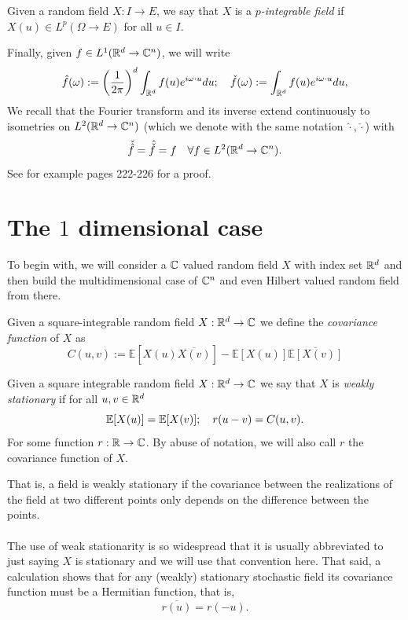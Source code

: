 \documentclass[
    a4paper,
    DIV=14,
    abstract=true,
    numbers=noenddot
]{scrartcl}
\begin{document}
\begin{definition}
	Given a  random field $X:I\to E$, we say that $X$ is a \emph{$p$-integrable field} if $X(u)\in L^p(\Omega\to E)$ for all $u\in I$.
\end{definition}
Finally, given $f\in L^1(\mathbb{R}^d\to\mathbb{C}^n)$, we will write
\begin{equation}\label{ft def}
	\hat{f}(\omega):=\qty(\frac{1}{2\pi})^d\int_{\mathbb{R}^d} f(u)e^{i\omega\cdot  u}du;\quad\check{f}(\omega):=\int_{\mathbb{R}^d} f(u)e^{i\omega\cdot  u}du,
\end{equation}
We recall that the Fourier transform and its inverse extend continuously to isometries on $L^2(\mathbb{R}^d\to\mathbb{C}^n)$ (which we denote with the same notation $\hat{\cdot},\check{\cdot}$) with
\begin{equation}
	\check{\hat{f}}=\hat{\check{f}}=f\quad\forall f\in L^2(\mathbb{R}^d\to\mathbb{C}^n).
\end{equation}
See for example \cite{taylor2013partial} pages 222-226 for a proof.
\section{The $1$ dimensional case}\label{1d}
To begin with, we will consider a $\mathbb{C}$ valued random field $X$ with index set $\mathbb{R}^d$ and then build the multidimensional case of $\mathbb{C}^n$ and even Hilbert valued random field from there.
\begin{definition}
	Given a square-integrable random field $X:\mathbb{R}^d\to \mathbb{C}$ we define the \emph{covariance function} of $X$ as
	\begin{equation*}
		C(u,v):=\mathbb{E}[X(u)\overline{X(v)}]-\mathbb{E}[X(u)]\overline{\mathbb{E}[X(v)]}
	\end{equation*}
\end{definition}
\begin{definition}
	Given a square integrable random field $X:\mathbb{R}^d\to\mathbb{C}$  we say that $X$ is \emph{weakly stationary} if for all $u,v\in \mathbb{R}^d$
	\begin{equation*}
		\mathbb{E}[X(u)]=\mathbb{E}[X(v)];\quad r(u-v)=C(u,v).
	\end{equation*}
	For some function $r:\mathbb{R}\to \mathbb{C}$. By abuse of notation, we will also call $r$ the covariance function of $X$.
\end{definition}
That is, a field is weakly stationary if the covariance between the realizations of the field at two different points only depends on the difference between the points.\\
\\
The use of weak stationarity is so widespread that it is usually abbreviated to just saying $X$ is stationary and we will use that convention here. That said, a calculation shows that for any (weakly) stationary stochastic field its covariance function must be a Hermitian function, that is,
\begin{equation*}
	\overline{r(u)}=r(-u).
\end{equation*}
\end{document}
